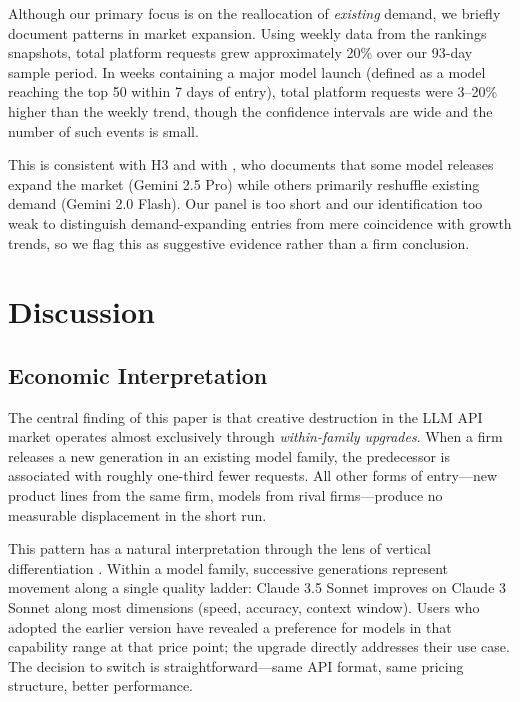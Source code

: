 \documentclass[11pt, a4paper]{article}
\begin{document}
Although our primary focus is on the reallocation of \emph{existing} demand, we briefly document patterns in market expansion. Using weekly data from the rankings snapshots, total platform requests grew approximately 20\% over our 93-day sample period. In weeks containing a major model launch (defined as a model reaching the top 50 within 7 days of entry), total platform requests were 3--20\% higher than the weekly trend, though the confidence intervals are wide and the number of such events is small.

This is consistent with H3 and with \citet{fradkin2025demand}, who documents that some model releases expand the market (Gemini 2.5 Pro) while others primarily reshuffle existing demand (Gemini 2.0 Flash). Our panel is too short and our identification too weak to distinguish demand-expanding entries from mere coincidence with growth trends, so we flag this as suggestive evidence rather than a firm conclusion.

\section{Discussion}
\label{sec:discussion}

\subsection{Economic Interpretation}

The central finding of this paper is that creative destruction in the LLM API market operates almost exclusively through \emph{within-family upgrades}. When a firm releases a new generation in an existing model family, the predecessor is associated with roughly one-third fewer requests. All other forms of entry---new product lines from the same firm, models from rival firms---produce no measurable displacement in the short run.

This pattern has a natural interpretation through the lens of vertical differentiation \citep{shaked1982relaxing}. Within a model family, successive generations represent movement along a single quality ladder: Claude 3.5 Sonnet improves on Claude 3 Sonnet along most dimensions (speed, accuracy, context window). Users who adopted the earlier version have revealed a preference for models in that capability range at that price point; the upgrade directly addresses their use case. The decision to switch is straightforward---same API format, same pricing structure, better performance.
\end{document}

